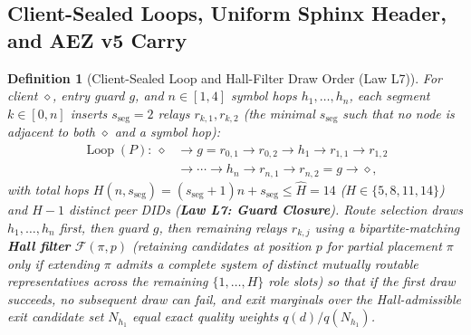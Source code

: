 \documentclass[journal]{IEEEtran}
\newtheorem{definition}{Definition}
\begin{document}
\subsection{Client-Sealed Loops, Uniform Sphinx Header, and AEZ v5 Carry}

\begin{definition}[Client-Sealed Loop and Hall-Filter Draw Order (Law L7)]\label{def:onion-loop}
For client $\diamond$, entry guard $g$, and $n\in[1,4]$ symbol hops $h_1,\dots,h_n$,
each segment $k\in[0,n]$ inserts $s_{\mathrm{seg}}=2$ relays $r_{k,1},r_{k,2}$ (the minimal $s_{\mathrm{seg}}$
such that no node is adjacent to both $\diamond$ and a symbol hop):
\[
\begin{aligned}
  \operatorname{Loop}(P):\ \diamond&\to g=r_{0,1}\to r_{0,2}\to h_1\to r_{1,1}\to r_{1,2}\\
  &\to\cdots\to h_n\to r_{n,1}\to r_{n,2}=g\to\diamond,
\end{aligned}
\]
with total hops $H(n,s_{\mathrm{seg}})=(s_{\mathrm{seg}}+1)n+s_{\mathrm{seg}}\le\hat{H}=14$ ($H\in\{5,8,11,14\}$) and $H-1$
distinct peer DIDs (\textbf{Law L7: Guard Closure}).  Route selection draws
$h_1,\dots,h_n$ first, then guard $g$, then remaining relays $r_{k,j}$ using a
bipartite-matching \textbf{Hall filter} $\mathcal{F}(\pi,p)$ (retaining candidates at position $p$ for partial placement $\pi$ only if extending $\pi$ admits a complete system of distinct mutually routable representatives across the remaining $\{1,\dots,H\}$ role slots) so that if the first draw succeeds,
no subsequent draw can fail, and exit marginals over the Hall-admissible exit candidate set $N_{h_1}$ equal exact quality weights
$q(d)/q(N_{h_1})$.
\end{definition}
\end{document}
